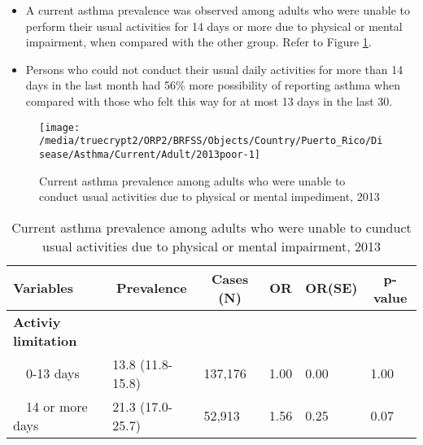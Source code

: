  \newpage
\begin{itemize}

\item A  
current asthma prevalence was observed among adults who were unable to perform their usual activities for 14 days or more due to physical or mental impairment, when compared with the other group. Refer to Figure \ref{fig:poor.Asthma.2013}.



\item Persons who could not conduct their usual daily activities for more than 14 days in the last month had 56\% more possibility of reporting asthma when compared with those who felt this way for at most 13 days in the last 30.

\end{itemize}

\begin{figure}[H]
\caption{Current asthma prevalence among adults who were unable to conduct usual activities due to physical or mental impediment, 2013}
\label{fig:poor.Asthma.2013}

\begin{knitrout}
\color{fgcolor}

{\centering \texttt{[image: /media/truecrypt2/ORP2/BRFSS/Objects/Country/Puerto\_Rico/Disease/Asthma/Current/Adult/2013poor-1]} 

}



\end{knitrout}
\end{figure}

\begin{table}[H]
\caption{Current asthma prevalence among adults who were unable to cunduct usual activities due to physical or mental impairment, 2013\label{tab:poor.Asthma.2013}} 
\begin{center}
\begin{tabular}{llllll}
\hline\hline
\multicolumn{1}{l}{Variables}&\multicolumn{1}{c}{Prevalence}&\multicolumn{1}{c}{Cases (N)}&\multicolumn{1}{c}{OR}&\multicolumn{1}{c}{OR(SE)}&\multicolumn{1}{c}{p-value}\tabularnewline
\hline
{\bfseries Activiy limitation}&&&&&\tabularnewline
~~0-13 days&13.8 (11.8-15.8)&137,176&1.00&0.00&1.00\tabularnewline
~~14 or more days&21.3 (17.0-25.7)& 52,913&1.56&0.25&0.07\tabularnewline
\hline
\end{tabular}\end{center}

\end{table}


